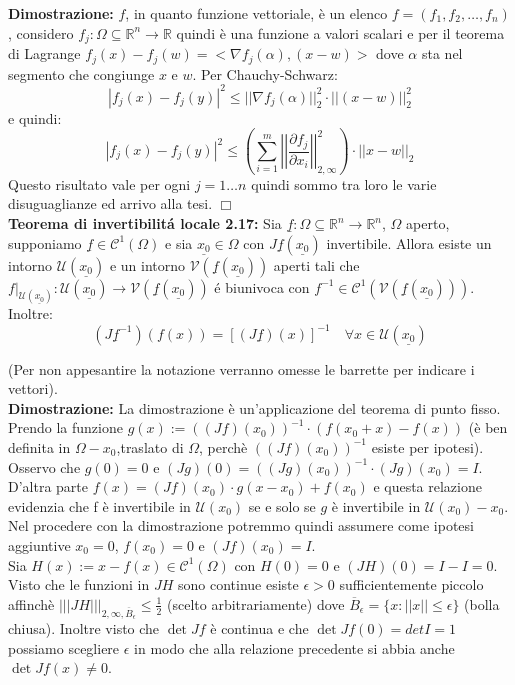 \documentclass[a4paper,11pt,titlepage]{book}
\begin{document}
\textbf{Dimostrazione:}   $f$, in quanto funzione vettoriale, è un elenco $f=(f_1,f_2,\ldots,f_n)$, considero $f_j:\Omega\subseteq\mathbb{R}^n\to\mathbb{R}$ quindi è una funzione a valori scalari e per il teorema di Lagrange $f_j(x)-f_j(w)=<\nabla f_j(\alpha),(x-w)>$ dove $\alpha$ sta nel segmento che congiunge $x$ e $w$. Per Chauchy-Schwarz: $$|f_j(x)-f_j(y)|^2\leq||\nabla f_j(\alpha)||_2^2\cdot||(x-w)||_2^2$$ e quindi: $$|f_j(x)-f_j(y)|^2\leq\left(\sum_{i=1}^m \left|\left|\frac{\partial f_j}{\partial x_i}\right|\right|^2_{2,\infty}\right)\cdot ||x-w||_2$$ Questo risultato vale per ogni $j=1\ldots n$ quindi sommo tra loro le varie disuguaglianze ed arrivo alla tesi. $\Box$\\

\textbf{Teorema di invertibilitá locale 2.17:} Sia $\underline{f}:\Omega\subseteq\mathbb{R}^n\to\mathbb{R}^n$, $\Omega$ aperto, supponiamo $\underline{f}\in\mathcal{C}^1(\Omega)$ e sia $\underline{x_0}\in\Omega$ con $J\underline{f}(\underline{x_0})$ invertibile. Allora esiste un intorno $\mathcal{U}(\underline{x_0})$ e un intorno $\mathcal{V}(\underline{f}(\underline{x_0}))$ aperti tali che $f|_{\mathcal{U}(\underline{x_0})}:\mathcal{U}(\underline{x_0})\to\mathcal{V}(\underline{f}(\underline{x_0}))$ é biunivoca  con $f^{-1}\in\mathcal{C}^1(\mathcal{V}(\underline{f}(\underline{x_0})))$. Inoltre: $$ (J\underline{f}^{-1})(f(x))=[(J\underline{f})(x)]^{-1}\quad\forall x \in \mathcal{U}(\underline{x_0})$$

(Per non appesantire la notazione verranno omesse le barrette per indicare i vettori).\\

\textbf{Dimostrazione: }La dimostrazione è un'applicazione del teorema di punto fisso. Prendo la funzione $g(x):=((Jf)(x_0))^{-1}\cdot(f(x_0+x)-f(x))$ (è ben definita in $\Omega-x_0$,traslato di $\Omega$, perchè $((Jf)(x_0))^{-1}$ esiste per ipotesi). Osservo che $g(0)=0$ e $(Jg)(0)=((Jg)(x_0))^{-1}\cdot(Jg)(x_0)=I$. D'altra parte $f(x)=(Jf)(x_0)\cdot g(x-x_0)+f(x_0)$ e questa relazione evidenzia che f è invertibile in $\mathcal{U}(x_0)$ se e solo se $g$ è invertibile in $\mathcal{U}(x_0)-x_0$. Nel procedere con la dimostrazione potremmo quindi assumere come ipotesi aggiuntive $x_0=0$, $f(x_0)=0$ e $(Jf)(x_0)=I$.\\

Sia $H(x):=x-f(x)\in\mathcal{C}^1(\Omega)$ con $H(0)=0$ e $(JH)(0)=I-I=0$. Visto che le funzioni in $JH$ sono continue esiste $\epsilon >0$ sufficientemente piccolo affinchè $|||JH|||_{2,\infty,\overline{B}_\epsilon}\leq\frac{1}{2}$ (scelto arbitrariamente) dove $\overline{B}_\epsilon=\{x:||x||\leq\epsilon\}$ (bolla chiusa). Inoltre visto che $\det Jf$ è continua e che $\det Jf(0)=det I=1$ possiamo scegliere $\epsilon$ in modo che alla relazione precedente si abbia anche $\det Jf(x)\ne 0$. \\
\end{document}
